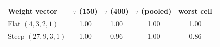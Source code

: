 \begin{tabular}{lcccc}
\toprule
Weight vector & $\tau$ (150) & $\tau$ (400) & $\tau$ (pooled) & worst cell \\
\midrule
Flat $(4,3,2,1)$ & 1.00 & 1.00 & 1.00 & 1.00 \\
Steep $(27,9,3,1)$ & 1.00 & 0.96 & 1.00 & 0.86 \\
\bottomrule
\end{tabular}
